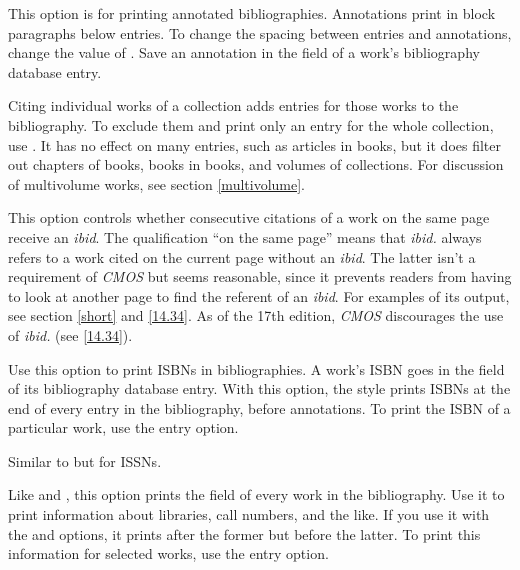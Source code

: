 \documentclass[11pt,letterpaper,oneside]{article}
\begin{document}
\begin{optionlist}


\noindent This option is for printing annotated bibliographies.
Annotations print in block paragraphs below entries. To change
the spacing between entries and annotations, change the value of
. Save an annotation in the 
field of a work's bibliography database entry.


\noindent Citing individual works of a collection adds entries for
those works to the bibliography. To exclude them and print only an
entry for the whole collection, use . It has no effect
on many  entries, such as articles in books, but
it does filter out chapters of books, books in books, and volumes of
collections. For discussion of multivolume works, see section
\ref{multivolume}.


\noindent This option controls whether consecutive citations of a work
on the same page receive an \textit{ibid}. The qualification ``on the
same page'' means that \textit{ibid.} always refers to a work cited on
the current page without an \textit{ibid}. The latter isn't a
requirement of \textit{CMOS} but seems reasonable, since it prevents
readers from having to look at another page to find the referent of an
\textit{ibid}. For examples of its output, see section \ref{short} and
\ref{14.34}. As of the 17th edition, \textit{CMOS} discourages the use
of \textit{ibid.} (see \ref{14.34}).


\noindent Use this option to print ISBNs in bibliographies. A work's
ISBN goes in the  field of its bibliography database
entry. With this option, the style prints ISBNs at the end of every
entry in the bibliography, before annotations. To print the ISBN of a
particular work, use the  entry option.


\noindent Similar to  but for ISSNs.


\noindent Like  and , this option prints the
 field of every work in the bibliography. Use it to
print information about libraries, call numbers, and the like. If you
use it with the  and  options, it prints
after the former but before the latter. To print this information for
selected works, use the  entry option.


\end{optionlist}
\end{document}
